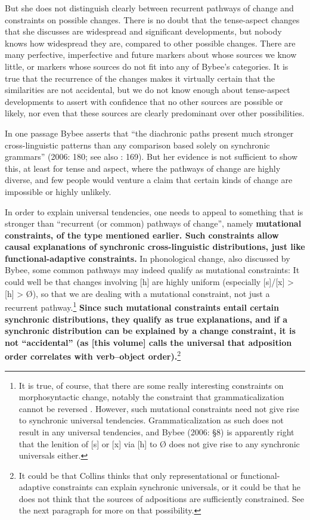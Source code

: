 \documentclass[output=paper]{langsci/langscibook}
\begin{document}
 
But she does not distinguish clearly between recurrent pathways of change and constraints on possible changes. There is no doubt that the tense-aspect changes that she discusses are widespread and significant developments, but nobody knows how widespread they are, compared to other possible changes. There are many perfective, imperfective and future markers about whose sources we know little, or markers whose sources do not fit into any of Bybee’s categories. It is true that the recurrence of the changes makes it virtually certain that the similarities are not accidental, but we do not know enough about tense-aspect developments to assert with confidence that no other sources are possible or likely, nor even that these sources are clearly predominant over other possibilities. 
 
In one passage Bybee asserts that “the diachronic paths present much stronger cross-linguistic patterns than any comparison based solely on synchronic grammars” (2006: 180; see also \citealt{Bybee2008}: 169). But her evidence is not sufficient to show this, at least for tense and aspect, where the pathways of change are highly diverse, and few people would venture a claim that certain kinds of change are impossible or highly unlikely. 
 
In order to explain universal tendencies, one needs to appeal to something that is stronger than “recurrent (or common) pathways of change”, namely \textbf{{mutational constraints, of the type mentioned earlier. Such constraints allow causal explanations of synchronic cross-linguistic distributions, just like functional-adaptive constraints.} }In phonological change, also discussed by Bybee, some common pathways may indeed qualify as mutational constraints: It could well be that changes involving [h] are highly uniform (especially [s]/[x] > [h] > Ø), so that we are dealing with a mutational constraint, not just a recurrent pathway.\footnote{It is true, of course, that there are some really interesting constraints on morphosyntactic change, notably the constraint that grammaticalization cannot be reversed \citep{Haspelmath1999b}. However, such mutational constraints need not give rise to synchronic universal tendencies. Grammaticalization as such does not result in any universal tendencies, and Bybee (2006: §8) is apparently right that the lenition of [s] or [x] via [h] to Ø does not give rise to any synchronic universals either.}\textbf{{ Since such mutational constraints entail certain synchronic distributions, they qualify as true explanations, and if a synchronic distribution can be explained by a change constraint, it is not “accidental” (as \citealt{Collins2018} [this volume] calls the universal that adposition order correlates with verb–object order).}}\footnote{It could be that Collins thinks that only representational or functional-adaptive constraints can explain synchronic universals, or it could be that he does not think that the sources of adpositions are sufficiently constrained. See the next paragraph for more on that possibility.}
 
\end{document}

